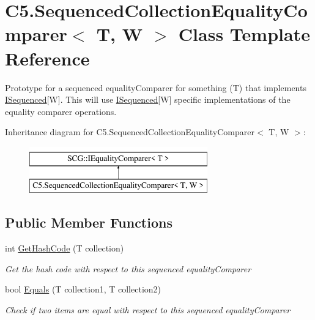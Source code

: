 \hypertarget{class_c5_1_1_sequenced_collection_equality_comparer}{}\section{C5.\+Sequenced\+Collection\+Equality\+Comparer$<$ T, W $>$ Class Template Reference}
\label{class_c5_1_1_sequenced_collection_equality_comparer}


Prototype for a sequenced equality\+Comparer for something (T) that implements \hyperlink{interface_c5_1_1_i_sequenced}{I\+Sequenced}\mbox{[}W\mbox{]}. This will use \hyperlink{interface_c5_1_1_i_sequenced}{I\+Sequenced}\mbox{[}W\mbox{]} specific implementations of the equality comparer operations.  


Inheritance diagram for C5.\+Sequenced\+Collection\+Equality\+Comparer$<$ T, W $>$\+:\begin{figure}[H]
\begin{center}
\leavevmode
\includegraphics[height=2.000000cm]{class_c5_1_1_sequenced_collection_equality_comparer}
\end{center}
\end{figure}
\subsection*{Public Member Functions}
\begin{DoxyCompactItemize}
\item 
int \hyperlink{class_c5_1_1_sequenced_collection_equality_comparer_a2a311403828c52a93aaed029ad34bb50}{Get\+Hash\+Code} (T collection)
\begin{DoxyCompactList}\small\item\em Get the hash code with respect to this sequenced equality\+Comparer \end{DoxyCompactList}\item 
bool \hyperlink{class_c5_1_1_sequenced_collection_equality_comparer_a5eb3b401c398fc22745a43f79ab285da}{Equals} (T collection1, T collection2)
\begin{DoxyCompactList}\small\item\em Check if two items are equal with respect to this sequenced equality\+Comparer \end{DoxyCompactList}\end{DoxyCompactItemize}
